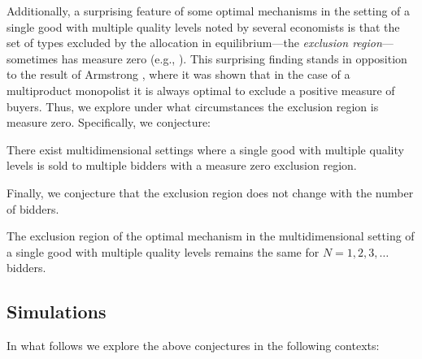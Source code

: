 Additionally, a surprising feature of some optimal mechanisms in the setting of a single good with multiple quality levels noted by several economists is that the set of types excluded by the allocation in equilibrium---the \textit{exclusion region}---sometimes has measure zero (e.g., \cite{thirumulanathan2019, belloni2010multidimensional}). This surprising finding stands in opposition to the result of Armstrong \autocite*{armstrong1996multiproduct}, where it was shown that in the case of a multiproduct monopolist it is always optimal to exclude a positive measure of buyers. Thus, we explore under what circumstances the exclusion region is measure zero. Specifically, we conjecture:

\begin{conjecture}\label{conj_excl_zero}
There exist multidimensional settings where a single good with multiple quality levels is sold to multiple bidders with a measure zero exclusion region.
\end{conjecture}

Finally, we conjecture that the exclusion region does not change with the number of bidders.

\begin{conjecture}\label{conj_excl_n}
The exclusion region of the optimal mechanism in the multidimensional setting of a single good with multiple quality levels remains the same for $N=1,2,3,\dots$ bidders. 
\end{conjecture}









\subsection{Simulations}\label{subsec_sim}

In what follows we explore the above conjectures in the following contexts:

